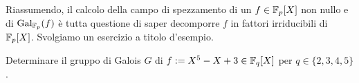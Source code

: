 %
%

Riassumendo, il calcolo della campo di spezzamento di un \(f \in \F_p[X]\) non nullo e di \(\Gal[\F_p] f\) è tutta questione di saper decomporre \(f\) in fattori irriducibili di \(\F_p[X]\). Svolgiamo un esercizio a titolo d'esempio.

\begin{eser}
Determinare il gruppo di Galois \(G\) di \(f := X^5-X+3 \in \F_q[X]\) per \(q \in \{2,3,4,5\}\).
\end{eser}


